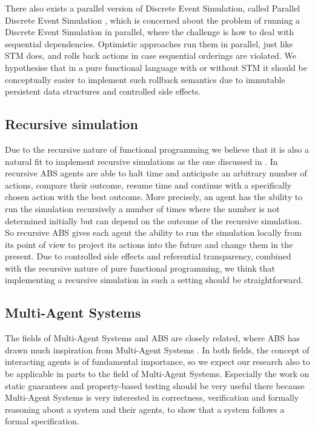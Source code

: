 There also exists a parallel version of Discrete Event Simulation, called Parallel Discrete Event Simulation \cite{fujimoto_parallel_2017}, which is concerned about the problem of running a Discrete Event Simulation in parallel, where the challenge is how to deal with sequential dependencies. Optimistic approaches run them in parallel, just like STM does, and rolls back actions in case sequential orderings are violated. We hypothesise that in a pure functional language with or without STM it should be conceptually easier to implement such rollback semantics due to immutable persistent data structures and controlled side effects.
 
\subsection{Recursive simulation}
Due to the recursive nature of functional programming we believe that it is also a natural fit to implement recursive simulations as the one discussed in \cite{gilmer_recursive_2000}. In recursive ABS agents are able to halt time and anticipate an arbitrary number of actions, compare their outcome, resume time and continue with a specifically chosen action with the best outcome. More precisely, an agent has the ability to run the simulation recursively a number of times where the number is not determined initially but can depend on the outcome of the recursive simulation. So recursive ABS gives each agent the ability to run the simulation locally from its point of view to project its actions into the future and change them in the present. Due to controlled side effects and referential transparency, combined with the recursive nature of pure functional programming, we think that implementing a recursive simulation in such a setting should be straightforward.

\subsection{Multi-Agent Systems}
The fields of Multi-Agent Systems and ABS are closely related, where ABS has drawn much inspiration from Multi-Agent Systems \cite{weiss_multiagent_2013,wooldridge_introduction_2009}. In both fields, the concept of interacting agents is of fundamental importance, so we expect our research also to be applicable in parts to the field of Multi-Agent Systems. Especially the work on static guarantees and property-based testing should be very useful there because Multi-Agent Systems is very interested in correctness, verification and formally reasoning about a system and their agents, to show that a system follows a formal specification.